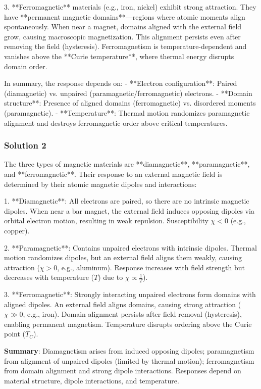 \documentclass{article}
\begin{document}
3. **Ferromagnetic** materials (e.g., iron, nickel) exhibit strong attraction. They have **permanent magnetic domains**—regions where atomic moments align spontaneously. When near a magnet, domains aligned with the external field grow, causing macroscopic magnetization. This alignment persists even after removing the field (hysteresis). Ferromagnetism is temperature-dependent and vanishes above the **Curie temperature**, where thermal energy disrupts domain order.  

In summary, the response depends on:  
- **Electron configuration**: Paired (diamagnetic) vs. unpaired (paramagnetic/ferromagnetic) electrons.  
- **Domain structure**: Presence of aligned domains (ferromagnetic) vs. disordered moments (paramagnetic).  
- **Temperature**: Thermal motion randomizes paramagnetic alignment and destroys ferromagnetic order above critical temperatures.

\subsubsection{Solution 2}
The three types of magnetic materials are **diamagnetic**, **paramagnetic**, and **ferromagnetic**. Their response to an external magnetic field is determined by their atomic magnetic dipoles and interactions:

1. **Diamagnetic**:  
   All electrons are paired, so there are no intrinsic magnetic dipoles. When near a bar magnet, the external field induces opposing dipoles via orbital electron motion, resulting in weak repulsion. Susceptibility \(\chi < 0\) (e.g., copper).

2. **Paramagnetic**:  
   Contains unpaired electrons with intrinsic dipoles. Thermal motion randomizes dipoles, but an external field aligns them weakly, causing attraction (\(\chi > 0\), e.g., aluminum). Response increases with field strength but decreases with temperature (\(T\)) due to \( \chi \propto \frac{1}{T} \)).

3. **Ferromagnetic**:  
   Strongly interacting unpaired electrons form domains with aligned dipoles. An external field aligns domains, causing strong attraction (\(\chi \gg 0\), e.g., iron). Domain alignment persists after field removal (hysteresis), enabling permanent magnetism. Temperature disrupts ordering above the Curie point (\(T_C\)).

\textbf{Summary}: Diamagnetism arises from induced opposing dipoles; paramagnetism from alignment of unpaired dipoles (limited by thermal motion); ferromagnetism from domain alignment and strong dipole interactions. Responses depend on material structure, dipole interactions, and temperature.
\end{document}
